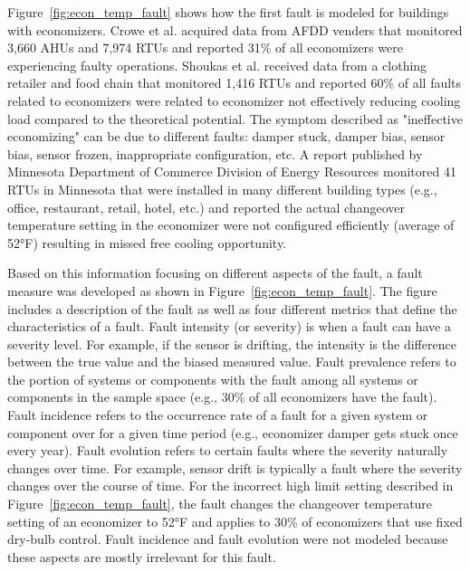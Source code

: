 Figure~\ref{fig:econ_temp_fault} shows how the first fault is modeled for buildings with economizers. Crowe et al. \citep{osti_1889192} acquired data from AFDD venders that monitored 3,660 AHUs and 7,974 RTUs and reported 31\% of all economizers were experiencing faulty operations. Shoukas et al. \citep{osti_1665808} received data from a clothing retailer and food chain that monitored 1,416 RTUs and reported 60\% of all faults related to economizers were related to economizer not effectively reducing cooling load compared to the theoretical potential. The symptom described as "ineffective economizing" can be due to different faults: damper stuck, damper bias, sensor bias, sensor frozen, inappropriate configuration, etc. A report \citep{seventhwave_rtu} published by Minnesota Department of Commerce Division of Energy Resources monitored 41 RTUs in Minnesota that were installed in many different building types (e.g., office, restaurant, retail, hotel, etc.) and reported the actual changeover temperature setting in the economizer were not configured efficiently (average of 52°F) resulting in missed free cooling opportunity.

Based on this information focusing on different aspects of the fault, a fault measure was developed as shown in Figure~\ref{fig:econ_temp_fault}. The figure includes a description of the fault as well as four different metrics that define the characteristics of a fault. Fault intensity (or severity) is when a fault can have a severity level. For example, if the sensor is drifting, the intensity is the difference between the true value and the biased measured value. Fault prevalence refers to the portion of systems or components with the fault among all systems or components in the sample space (e.g., 30\% of all economizers have the fault). Fault incidence refers to the occurrence rate of a fault for a given system or component over for a given time period (e.g., economizer damper gets stuck once every year). Fault evolution refers to certain faults where the severity naturally changes over time. For example, sensor drift is typically a fault where the severity changes over the course of time. For the incorrect high limit setting described in Figure~\ref{fig:econ_temp_fault}, the fault changes the changeover temperature setting of an economizer to 52°F and applies to 30\% of economizers that use fixed dry-bulb control. Fault incidence and fault evolution were not modeled because these aspects are mostly irrelevant for this fault.

